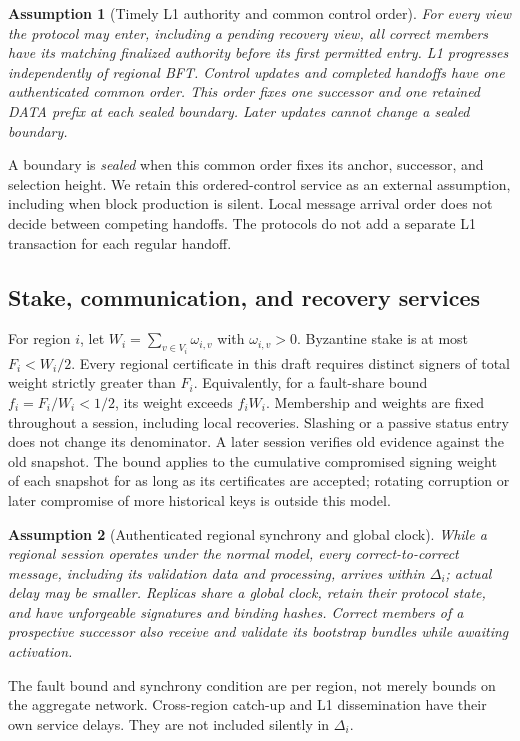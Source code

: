 \documentclass[11pt,a4paper]{article}
\newtheorem{assumption}[assumption]{Assumption}
\newcounter{protocol}
\begin{document}
\begin{assumption}[Timely L1 authority and common control order]
\label{ass:authority}
For every view the protocol may enter, including a pending recovery view,
all correct members have its matching finalized authority before its
first permitted entry. L1 progresses independently of regional BFT.
Control updates and completed handoffs have one authenticated common
order. This order fixes one successor and one retained DATA prefix at
each sealed boundary. Later updates cannot change a sealed boundary.
\end{assumption}
A boundary is \emph{sealed} when this common order fixes its anchor,
successor, and selection height. We retain this ordered-control service
as an external assumption, including when block production is silent.
Local message arrival order does not decide between competing handoffs.
The protocols do not add a separate L1 transaction for each regular
handoff.

\subsection{Stake, communication, and recovery services}
For region $i$, let $W_i=\sum_{v\in V_i}\omega_{i,v}$ with
$\omega_{i,v}>0$. Byzantine stake is at most $F_i<W_i/2$.
Every regional certificate in this draft requires distinct signers of
total weight strictly greater than $F_i$. Equivalently, for a fault-share
bound $f_i=F_i/W_i<1/2$, its weight exceeds $f_iW_i$.
Membership and weights are fixed throughout a session, including local
recoveries. Slashing or a passive status entry does not change its
denominator. A later session verifies old evidence against the old snapshot.
The bound applies to the cumulative compromised signing weight of each
snapshot for as long as its certificates are accepted; rotating corruption
or later compromise of more historical keys is outside this model.

\begin{assumption}[Authenticated regional synchrony and global clock]
\label{ass:network}
While a regional session operates under the normal model, every
correct-to-correct message, including its validation data and processing,
arrives within $\Delta_i$; actual delay may be smaller. Replicas share a
global clock, retain their protocol state, and have unforgeable signatures
and binding hashes. Correct members of a prospective successor also
receive and validate its bootstrap bundles while awaiting activation.
\end{assumption}
The fault bound and synchrony condition are per region, not merely bounds
on the aggregate network. Cross-region catch-up and L1 dissemination have
their own service delays. They are not included silently in $\Delta_i$.
\end{document}
